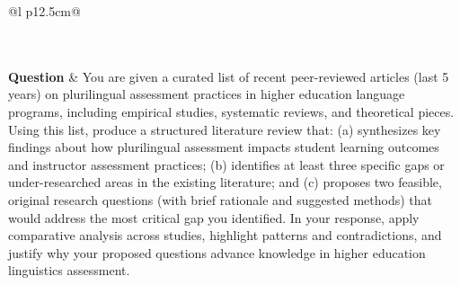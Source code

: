 \begin{longtable}{@{}l p{12.5cm}@{}}
  \caption{Skills per-instance answer comparison ($-75\% < \Delta \leq -50\%$) for the 2 most divergent items: same question, each model's answer and reasoning.}\label{tab:cmp_skills_neg50} \\
  \toprule
  \endfirsthead
  \toprule
  \endhead
   \\
  \textbf{Question} & You are given a curated list of recent peer-reviewed articles (last 5 years) on plurilingual assessment practices in higher education language programs, including empirical studies, systematic reviews, and theoretical pieces. Using this list, produce a structured literature review that: (a) synthesizes key findings about how plurilingual assessment impacts student learning outcomes and instructor assessment practices; (b) identifies at least three specific gaps or under-researched areas in the existing literature; and (c) proposes two feasible, original research questions (with brief rationale and suggested methods) that would address the most critical gap you identified. In your response, apply comparative analysis across studies, highlight patterns and contradictions, and justify why your proposed questions advance knowledge in higher education linguistics assessment. \\

\end{longtable}
